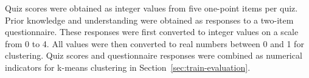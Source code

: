 Quiz scores were obtained as integer values from five one-point items per quiz.
Prior knowledge and understanding were obtained as responses to a two-item questionnaire. These responses were first converted to integer values on a scale from 0 to 4.
All values were then converted to real numbers between 0 and 1 for clustering.
Quiz scores and questionnaire responses were combined as numerical indicators for k-means clustering in Section~\ref{sec:train-evaluation}.
